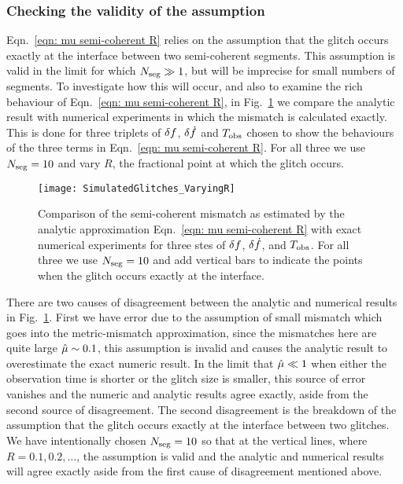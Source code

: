 \documentclass[../full_thesis/full_thesis.tex]{subfiles}
\begin{document}
\subsubsection{Checking the validity of the assumption}
Eqn.~\eqref{eqn: mu semi-coherent R} relies on the assumption that the glitch
occurs exactly at the interface between two semi-coherent segments. This
assumption is valid in the limit for which $N_{\textrm{seg}} \gg 1$, but will be imprecise
for small numbers of segments. To investigate how this will occur, and also to
examine the rich behaviour of Eqn.~\eqref{eqn: mu semi-coherent R}, in
Fig.~\ref{fig: varyingR} we compare the analytic result with numerical
experiments in which the mismatch is calculated exactly. This is done for three
triplets of $\delta f$, $\delta\dot{f}$ and $T_{\mathrm{obs}}$ chosen to show the behaviours of the
three terms in Eqn.~\eqref{eqn: mu semi-coherent R}. For all three we use
$N_{\textrm{seg}}=10$ and vary $R$, the fractional point at which the glitch occurs.
\begin{figure}
\centering
\texttt{[image: SimulatedGlitches\_VaryingR]}
\caption{Comparison of the semi-coherent mismatch as estimated by the analytic
         approximation Eqn.~\eqref{eqn: mu semi-coherent R} with
         exact numerical experiments for three stes of $\delta f$,
         $\delta\dot{f}$, and $T_{\mathrm{obs}}$. For all three we use $N_{\textrm{seg}}=10$ and add vertical bars
         to indicate the points when the glitch occurs exactly at the interface.}
\label{fig: varyingR}
\end{figure}

There are two causes of disagreement between the analytic and numerical results
in Fig.~\ref{fig: varyingR}. First we have error due to the assumption of small
mismatch which goes into the metric-mismatch approximation, since the
mismatches here are quite large $\hat{\mu} \sim 0.1$, this assumption is invalid
and causes the analytic result to overestimate the exact numeric
result. In the limit that $\hat{\mu} \ll 1$ when either the observation time is
shorter or the glitch size is smaller, this source of error vanishes and the
numeric and analytic results agree exactly, aside
from the second source of disagreement.  The second disagreement is the
breakdown of the assumption that the glitch occurs exactly at the interface
between two glitches. We have intentionally chosen $N_{\textrm{seg}}=10$ so that at the
vertical lines, where $R=0.1, 0.2, \dots$, the assumption is valid and the
analytic and numerical results will agree exactly aside from the first cause
of disagreement mentioned above.
\end{document}
